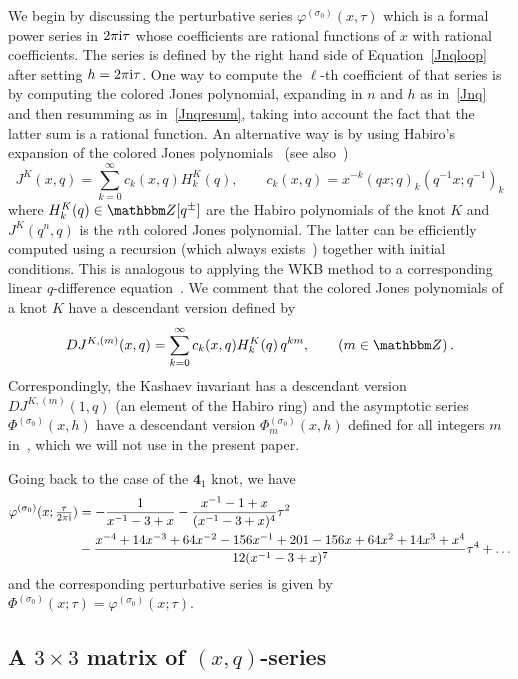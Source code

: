 \documentclass[12pt,reqno]{amsart}
\theoremstyle{definition}
\def\BZ{\mathbbm Z}
\def\s{\sigma}
\def\be{\begin{equation}}
\def\ee{\end{equation}}
\def\ri{\mathrm{i}}
\def\ri{{\rm i}}
\def\md{\mathbf}
\newcommand{\knot}[1]{\md{#1}}
\begin{document}
We begin by discussing the perturbative series
$\varphi^{(\s_0)}(x,\tau)$ which is a formal power series in
$2\pi\ri\tau$ whose coefficients are rational functions of $x$ with
rational coefficients. The series is defined by the right hand side of
Equation~\eqref{Jnqloop} after setting $h=2\pi\ri\tau$.
One way to compute the $\ell$-th coefficient of that series
is by computing the colored Jones polynomial, expanding in $n$ and $h$
as in~\eqref{Jnq} and then resumming as in~\eqref{Jnqresum}, taking
into account the fact that the latter sum is a rational function. An
alternative way is by using Habiro's expansion of the colored Jones
polynomials~\cite{Habiro:sl2} (see also~\cite{Habiro:WRT})
\begin{equation}
\label{JHx}
J^K(x,q) = \sum_{k=0}^\infty c_{k}(x,q) H^K_k(q), \qquad
c_{k}(x,q) = x^{-k}(q x;q)_k (q^{-1}x;q^{-1})_k 
\end{equation}
where $H^K_k(q) \in \BZ[q^\pm]$ are the Habiro polynomials of the knot $K$
and $J^K(q^n,q)$ is the $n$th colored Jones polynomial. The latter
can be efficiently computed using a recursion (which always exists~\cite{GL}) together
with initial conditions. This is analogous to applying the WKB method to
a corresponding linear $q$-difference equation~\cite{DGLZ,Ga:diff}.
We comment that the colored Jones polynomials of a knot $K$ have a descendant
version defined by~\cite{GK:desc}
\be
\label{DJdef}
DJ^{K,(m)}(x,q) = \sum_{k=0}^\infty c_{k}(x,q) H^K_k(q) \, q^{km}, \qquad (m \in \BZ)\,.
\ee
Correspondingly, the Kashaev invariant has a descendant version $DJ^{K,(m)}(1,q)$
(an element of the Habiro ring) and the asymptotic series 
$\Phi^{(\s_0)}(x,h)$ have a descendant version
$\Phi^{(\s_0)}_m(x,h)$ defined for all integers $m$ in~\cite{GK:desc}, which we will
not use in the present paper. 

Going back to the case of the $\knot{4}_1$ knot, we have
\begin{align}
\label{Phi410x}
\varphi^{(\s_0)}(x;\tfrac{\tau}{2\pi\ri}) &=
    -\frac{1}{x^{-1}-3+x}
    -\frac{x^{-1}-1+x}{(x^{-1}-3+x)^4}\tau^2 \\ &
    -\frac{x^{-4}+14x^{-3}+64x^{-2}-156x^{-1}
    +201-156x+64x^2+14x^3+x^4}
    {12(x^{-1}-3+x)^7}\tau^4
    +\ldots
\end{align}
and the corresponding perturbative series is given by $\Phi^{(\s_0)}(x;\tau) =
\varphi^{(\s_0)}(x;\tau)$.

\subsection{A $3\times 3$ matrix of $(x,q)$-series}
\label{sub.41qx}
\end{document}
